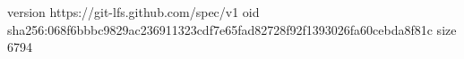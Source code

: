 version https://git-lfs.github.com/spec/v1
oid sha256:068f6bbbc9829ac236911323cdf7e65fad82728f92f1393026fa60cebda8f81c
size 6794
